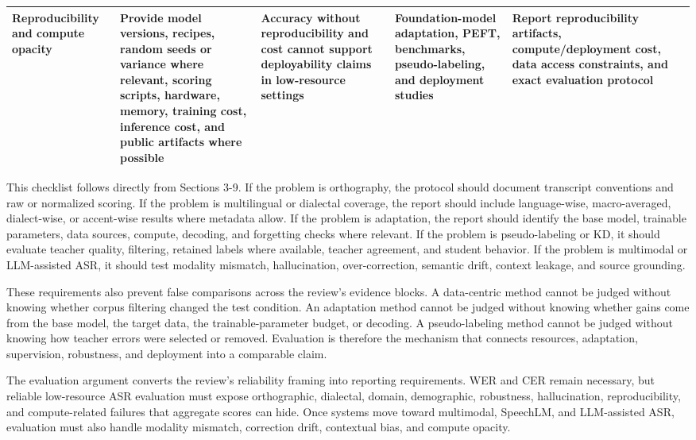 \documentclass[pdflatex,sn-basic]{sn-jnl}
\theoremstyle{thmstyleone}
\theoremstyle{thmstyletwo}
\theoremstyle{thmstylethree}
\begin{document}
\begin{table}[htbp]
\begin{tabularx}{\textwidth}{YYYYYY}
Reproducibility and compute opacity & Provide model versions, recipes, random seeds or variance where relevant, scoring scripts, hardware, memory, training cost, inference cost, and public artifacts where possible & Accuracy without reproducibility and cost cannot support deployability claims in low-resource settings & Foundation-model adaptation, PEFT, benchmarks, pseudo-labeling, and deployment studies & Report reproducibility artifacts, compute/deployment cost, data access constraints, and exact evaluation protocol & \citep{yang2021superb,watanabe2018espnet,ravanelli2021speechbrain,feng2022superbslt} \\
\bottomrule
\end{tabularx}
\end{table}

This checklist follows directly from Sections 3-9. If the problem is orthography, the protocol should document transcript conventions and raw or normalized scoring. If the problem is multilingual or dialectal coverage, the report should include language-wise, macro-averaged, dialect-wise, or accent-wise results where metadata allow. If the problem is adaptation, the report should identify the base model, trainable parameters, data sources, compute, decoding, and forgetting checks where relevant. If the problem is pseudo-labeling or KD, it should evaluate teacher quality, filtering, retained labels where available, teacher agreement, and student behavior. If the problem is multimodal or LLM-assisted ASR, it should test modality mismatch, hallucination, over-correction, semantic drift, context leakage, and source grounding.

These requirements also prevent false comparisons across the review's evidence blocks. A data-centric method cannot be judged without knowing whether corpus filtering changed the test condition. An adaptation method cannot be judged without knowing whether gains come from the base model, the target data, the trainable-parameter budget, or decoding. A pseudo-labeling method cannot be judged without knowing how teacher errors were selected or removed. Evaluation is therefore the mechanism that connects resources, adaptation, supervision, robustness, and deployment into a comparable claim.

The evaluation argument converts the review's reliability framing into reporting requirements. WER and CER remain necessary, but reliable low-resource ASR evaluation must expose orthographic, dialectal, domain, demographic, robustness, hallucination, reproducibility, and compute-related failures that aggregate scores can hide. Once systems move toward multimodal, SpeechLM, and LLM-assisted ASR, evaluation must also handle modality mismatch, correction drift, contextual bias, and compute opacity.
\end{document}
